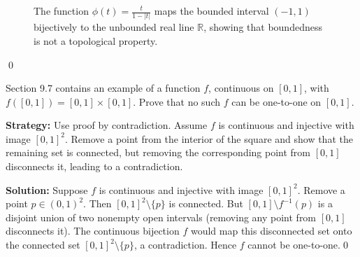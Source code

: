 \begin{figure}[h]
\centering
{}
\caption{The function $\phi(t) = \frac{t}{1-|t|}$ maps the bounded interval $(-1,1)$ bijectively to the unbounded real line $\mathbb{R}$, showing that boundedness is not a topological property.}
\end{figure}\qed



\begin{problembox}
Section 9.7 contains an example of a function $f$, continuous on $[0, 1]$, with $f([0, 1]) = [0, 1] \times [0, 1]$. Prove that no such $f$ can be one-to-one on $[0, 1]$.
\end{problembox}

\noindent\textbf{Strategy:} Use proof by contradiction. Assume $f$ is continuous and injective with image $[0,1]^2$. Remove a point from the interior of the square and show that the remaining set is connected, but removing the corresponding point from $[0,1]$ disconnects it, leading to a contradiction.

\bigskip\noindent\textbf{Solution:}
Suppose $f$ is continuous and injective with image $[0,1]^2$. Remove a point $p\in(0,1)^2$. Then $[0,1]^2\setminus\{p\}$ is connected. But $[0,1]\setminus f^{-1}(p)$ is a disjoint union of two nonempty open intervals (removing any point from $[0,1]$ disconnects it). The continuous bijection $f$ would map this disconnected set onto the connected set $[0,1]^2\setminus\{p\}$, a contradiction. Hence $f$ cannot be one-to-one.\qed

